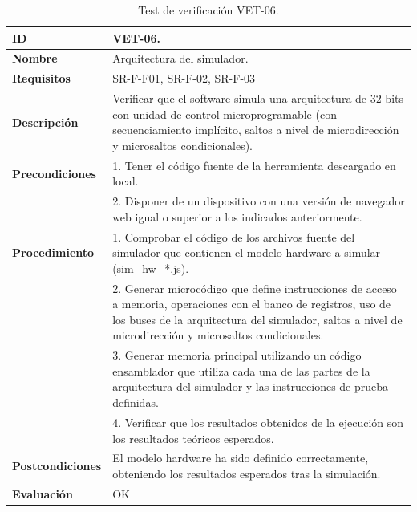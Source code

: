 \begin{center}
\begin{table}[htb]
\centering
\caption{Test de verificación VET-06.}
\begin{tabular}{@{}p{2.5cm} p{13cm}@{}} 
\toprule
\textbf{ID} 					& VET-06. \\
\midrule
\textbf{Nombre} 				& Arquitectura del simulador. \\
\midrule
\textbf{Requisitos} 		& SR-F-F01, SR-F-02, SR-F-03\\
\midrule
\textbf{Descripción} 		& Verificar que el software simula una arquitectura de 32 bits con unidad de control microprogramable (con secuenciamiento implícito, saltos a nivel de microdirección y microsaltos condicionales). \\
\midrule
\textbf{Precondiciones}		& 1. Tener el código fuente de la herramienta descargado en local. \\
											& 2. Disponer de un dispositivo con una versión de navegador web igual o superior a los indicados anteriormente. \\
\midrule
\textbf{Procedimiento}		& 1. Comprobar el código de los archivos fuente del simulador que contienen el modelo hardware a simular (sim\_hw\_*.js).\\
											& 2. Generar microcódigo que define instrucciones de acceso a memoria, operaciones con el banco de registros, uso de los buses de la arquitectura del simulador, saltos a nivel de microdirección y microsaltos condicionales.\\
											& 3. Generar memoria principal utilizando un código ensamblador que utiliza cada una de las partes de la arquitectura del simulador y las instrucciones de prueba definidas.\\
							& 4. Verificar que los resultados obtenidos de la ejecución son los resultados teóricos esperados.\\
\midrule
\textbf{Postcondiciones} 		&  El modelo hardware ha sido definido correctamente, obteniendo los resultados esperados tras la simulación.\\
\midrule
\textbf{Evaluación} 			& OK \\
\bottomrule
\end{tabular}
\label{tab:vet06}
\end{table}
\end{center}

